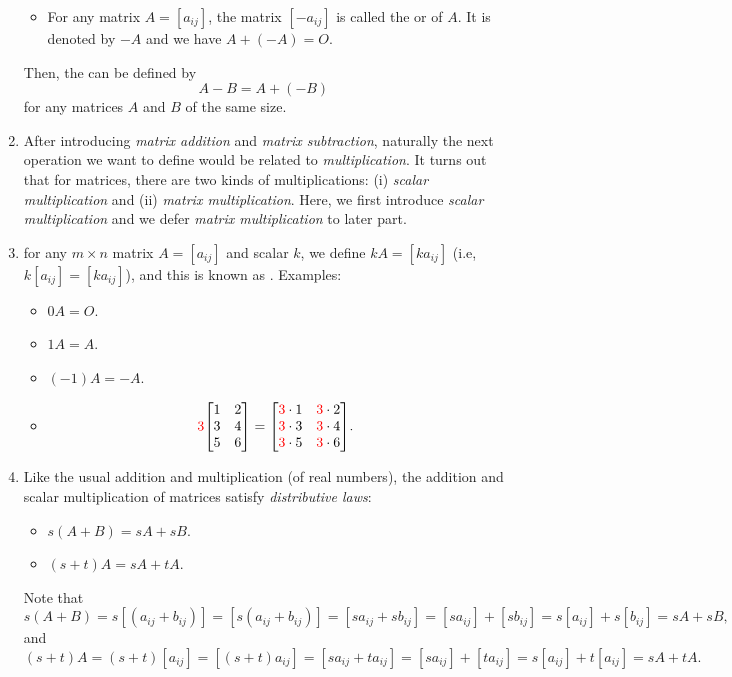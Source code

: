 \begin{enumerate}
\begin{itemize}
\item For any matrix \(A=[a_{ij}]\), the matrix \([-a_{ij}]\) is called the
 or  of \(A\). It is denoted by \(-A\)
and we have \(A+(-A)=O\).
\end{itemize}
Then, the  can be defined by
\[
A-B=A+(-B)
\]
for any matrices \(A\) and \(B\) of the same size.

\item After introducing \emph{matrix addition} and \emph{matrix subtraction},
naturally the next operation we want to define would be related to
\emph{multiplication}. It turns out that for matrices, there are two kinds of
multiplications: (i) \emph{scalar multiplication} and (ii) \emph{matrix
multiplication}. Here, we first introduce \emph{scalar multiplication} and we
defer \emph{matrix multiplication} to later part.

\item for any \(m\times n\) matrix \(A=[a_{ij}]\) and scalar \(k\), we define
\(kA=[ka_{ij}]\) (i.e, \(k[a_{ij}]=[ka_{ij}]\)), and this is known as
. Examples:
\begin{itemize}
\item \(0A=O\).
\item \(1A=A\).
\item \((-1)A=-A\).
\item \[
\rc{3}\mqty[1&2\\3&4\\5&6]
=\mqty[\rc{3}\cdot 1&\rc{3}\cdot 2\\ \rc{3}\cdot 3 & \rc{3}\cdot 4\\ \rc{3}\cdot 5& \rc{3}\cdot 6].
\]
\end{itemize}
\item \label{it:matrix-add-scalar-mult-dist}
Like the usual addition and multiplication (of real numbers), the
addition and scalar multiplication of matrices satisfy \emph{distributive
laws}:
\begin{itemize}
\item \(s(A+B)=sA+sB\).
\item \((s+t)A=sA+tA\).
\end{itemize}
\begin{pf}
Note that
\[
s(A+B)=s[(a_{ij}+b_{ij})]
=[s(a_{ij}+b_{ij})]
=[sa_{ij}+sb_{ij}]
=[sa_{ij}]+[sb_{ij}]
=s[a_{ij}]+s[b_{ij}]
=sA+sB,
\]
and
\[
(s+t)A=(s+t)[a_{ij}]
=[(s+t)a_{ij}]
=[sa_{ij}+ta_{ij}]
=[sa_{ij}]+[ta_{ij}]
=s[a_{ij}]+t[a_{ij}]
=sA+tA.
\]
\end{pf}


\end{enumerate}
